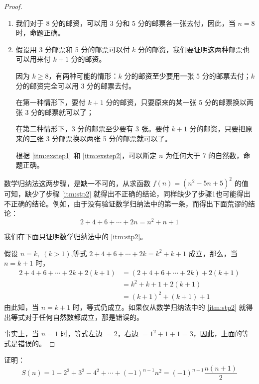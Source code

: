 \begin{proof}
\begin{enumerate}
  \item\label{itm:exstep1} 我们对于 8 分的邮资，可以用 3 分和 5 分的邮票各一张去付，因此，当 $n=8$ 时，命题正确。
  \item\label{itm:exstep2} 假设用 3 分邮票和 5 分的邮票可以付 $k$ 分的邮资，我们要证明这两种邮票也可以用来付 $k+1$ 分的邮资。

  因为 $k\geqslant 8$，有两种可能的情形：$k$ 分的邮资至少要用一张 5 分的邮票去付；$k$ 分的邮资完全可以用 3 分的邮票去付。

  在第一种情形下，要付 $k+1$ 分的邮资，只要原来的某一张 5 分的邮票换以两张 3 分的邮票就可以了；

  在第二种情形下，3 分的邮票至少要有 3 张。要付 $k+1$ 分的邮资，只要把原来的三张 3 分邮票换以两张 5 分的邮票就可以了。

  根据 \ref{itm:exstep1} 和 \ref{itm:exstep2}，可以断定 $n$ 为任何大于 7 的自然数，命题正确。
\end{enumerate}

\bigskip
数学归纳法这两步骤，是缺一不可的，从求函数 $f(n)=(n^2-5n+5)^2$ 的值可知，缺少了步骤 \ref{itm:stp2} 就得出不正确的结论，同样缺少了步骤1也可能得出不正确的结论。例如，由于没有验证数学归纳法中的第一条，而得出下面荒谬的结论：
\[2+4+6+\cdots+2n=n^2+n+1\]

我们在下面只证明数学归纳法中的 \ref{itm:stp2}。

假设 $n=k,\; (k>1)$,等式 $2+4+6+\cdots+2k=k^2+k+1$ 成立，那么，当 $n=k+1$ 时，
\begin{align*}
    2+4+6+\cdots+2k+2(k+1)&=(2+4+6+\cdots+2k)+2(k+1)\\
&=k^2+k+1+2(k+1)  \tag{数学归纳法假设}\\
&=(k+1)^2+(k+1)+1
\end{align*}
由此知，当 $n=k+1$ 时，等式仍成立。如果仅从数学归纳法中的 \ref{itm:stp2} 就得出等式对于任何自然数都成立，那是错误的。

事实上，当 $n=1$ 时，等式左边 $=2$，右边 $=1^2+1+1=3$，因此，上面的等式是错误的。
\end{proof}

\begin{example}
    证明：
\[S(n)=1-2^2+3^2-4^2+\cdots+(-1)^{n-1}n^2=(-1)^{n-1}\frac{n(n+1)}{2}\]
\end{example}

